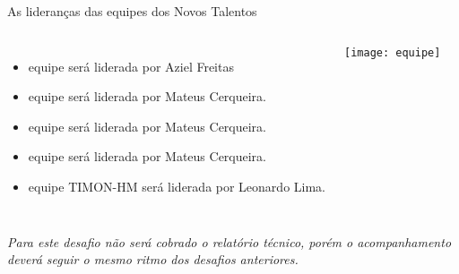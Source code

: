 \begin{frame}[t]{As lideranças das equipes dos Novos Talentos}
    \vspace{0.5cm}
    \begin{columns}
            \begin{itemize}
                \item equipe  será liderada por Aziel Freitas
                \item equipe  será liderada por Mateus Cerqueira.
                \item equipe  será liderada por Mateus Cerqueira.
                \item equipe  será liderada por Mateus Cerqueira.
                \item equipe TIMON-HM será liderada por Leonardo Lima.
            \end{itemize}
            \texttt{[image: equipe]}
    \end{columns}
    \vspace{1cm}
    
    \emph{Para este desafio não será cobrado o relatório técnico, porém o acompanhamento deverá seguir o mesmo ritmo dos desafios anteriores.}

\end{frame}
